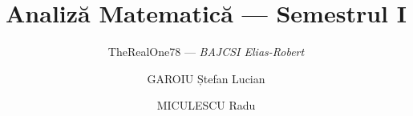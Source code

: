 \documentclass[a4paper, 12pt]{book}
\begin{document}
\title{Analiz\u{a} Matematic\u{a} --- Semestrul I}
\author{TheRealOne78 --- \textit{BAJCSI Elias-Robert} \and GAROIU Ștefan Lucian \and MICULESCU Radu}

\maketitle

\tableofcontents

\end{document}
